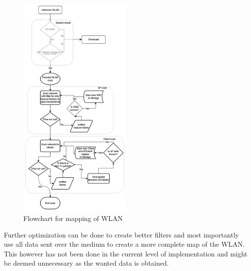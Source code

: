 \begin{figure}[!htbp]
    \centering
    \includegraphics[width=0.5\textwidth]{Latex-Files/Billeder/Flowcharts/network_flowchart.png}
    \caption{Flowchart for mapping of WLAN}
    \label{Flowchart}
\end{figure}

Further optimization can be done to create better filters and most importantly use all data sent over the medium to create a more complete map of the WLAN. This however has not been done in the current level of implementation and might be deemed unnecessary as the wanted data is obtained.

